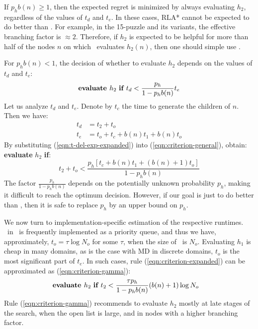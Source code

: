 If $p_h b(n) \ge 1$, then the expected regret is minimized by always
evaluating $h_2$, regardless of the values of $t_d$ and $t_e$.
In these cases, RLA* cannot be expected to do better than \lazyastar.
For example, in the 15-puzzle and its variants, the
effective branching factor is $\approx 2$. Therefore, if $h_2$ is expected to be helpful for more than half of the nodes $n$
on which \lazyastar~evaluates $h_2(n)$, then one should simple use \lazyastar.

For $p_h b(n) < 1$,  the decision of whether to evaluate $h_2$
depends on the values of $t_d$ and $t_e$:
\begin{equation}
\mbox{\bf evaluate }h_2\mbox{ \bf if }t_d<\frac {p_h} {1-p_hb(n)} t_e
\label{eqn:criterion-general}
\end{equation}
Let us analyze $t_d$ and $t_e$. Denote by
$t_c$ the time to generate the children of $n$. Then we have:
\begin{align}
t_d&=t_2+t_o\nonumber\\
t_e&=t_o + t_c+b (n) t_1 + b(n) t_o
\label{eqn:t-del-exp-expanded}
\end{align}
By substituting
(\ref{eqn:t-del-exp-expanded}) into (\ref{eqn:criterion-general}), obtain: {\bf evaluate} $h_2$ {\bf if}:
\begin{equation}
{t_2+t_o}<\frac {p_h \left[{t_c} + b (n)t_1+(b(n)+1){t_o}\right]} {1-p_hb(n)}
\label{eqn:criterion-expanded}
\end{equation}
The factor $\frac {p_h} {1-p_hb(n)}$ depends on the potentially unknown
probability $p_h$, making it difficult to reach the optimum decision.
However, if our goal is just to do better than \lazyastar, then it is safe to replace $p_h$ by an upper bound on $p_h$.

We now turn to implementation-specific estimation of the respective runtimes.
\OPEN~in \astar~is frequently implemented as a priority queue, and thus we have, approximately,
$t_o=\tau \log N_o$ for some $\tau$, when the size of \OPEN~is $N_o$.
Evaluating $h_1$ is cheap in many domains, as is the
case with MD in discrete domains, $t_o$ is the most significant part of
$t_{e}$. In such cases,
rule (\ref{eqn:criterion-expanded}) can be approximated as (\ref{eqn:criterion-gamma}):
\begin{align}
  &\mbox{\bf evaluate }h_2\mbox{ \bf if } t_2 < \frac {\tau p_h} {1-p_hb(n)} (b(n)+1)\log N_o
\label{eqn:criterion-gamma}
\end{align}
Rule (\ref{eqn:criterion-gamma})
recommends to evaluate $h_2$ mostly at late stages of the search,
when the open list is large, and in nodes with a higher branching factor.

